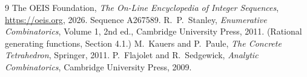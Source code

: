 \documentclass[11pt,a4paper]{article}
\theoremstyle{plain}
\theoremstyle{definition}
\begin{document}
\begin{thebibliography}{9}
 The OEIS Foundation, \emph{The On-Line Encyclopedia of Integer
Sequences}, \url{https://oeis.org}, 2026. Sequence A267589.
 R.~P.~Stanley, \emph{Enumerative Combinatorics}, Volume 1, 2nd ed.,
Cambridge University Press, 2011. (Rational generating functions, Section 4.1.)
 M.~Kauers and P.~Paule, \emph{The Concrete Tetrahedron}, Springer, 2011.
 P.~Flajolet and R.~Sedgewick, \emph{Analytic Combinatorics}, Cambridge
University Press, 2009.
\end{thebibliography}
\end{document}
